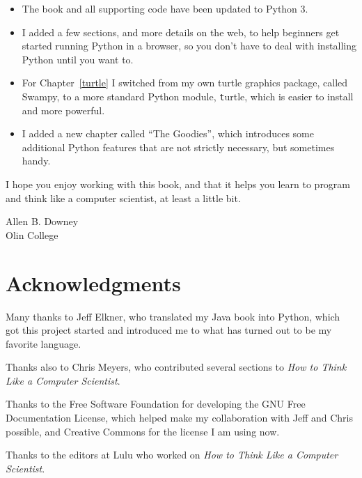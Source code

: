 \documentclass[
DIV=11,
fontsize=12,
twoside,
headinclude=false,
titlepage=firstiscover,
abstract=true,
headsepline=true,
footsepline=true,
chapterprefix=true, %
headings=big,
bibliography=totoc,%
captions=tableheading
]{scrbook}
\theoremstyle{definition}
\begin{document}
\begin{itemize}

\item The book and all supporting code have been updated to Python 3.

\item I added a few sections, and more details on the web, to help
beginners get started running Python in a browser, so you don't have
to deal with installing Python until you want to.

\item For Chapter~\ref{turtle} I switched from my own turtle graphics
  package, called Swampy, to a more standard Python module, {\texttt
    turtle}, which is easier to install and more powerful.

\item I added a new chapter called ``The Goodies'', which introduces
some additional Python features that are not strictly necessary, but
sometimes handy.

\end{itemize}

I hope you enjoy working with this book, and that it helps
you learn to program and think like
a computer scientist, at least a little bit.


Allen B. Downey \\

Olin College \\


\section*{Acknowledgments}

Many thanks to Jeff Elkner, who
translated my Java book into Python, which got this project
started and introduced me to what has turned out to be my
favorite language.

Thanks also to Chris Meyers, who contributed several sections
to {\em How to Think Like a Computer Scientist}.

Thanks to the Free Software Foundation for developing
the GNU Free Documentation License, which helped make
my collaboration with Jeff and Chris possible, and Creative
Commons for the license I am using now.

Thanks to the editors at Lulu who worked on
{\em How to Think Like a Computer Scientist}.
\end{document}
